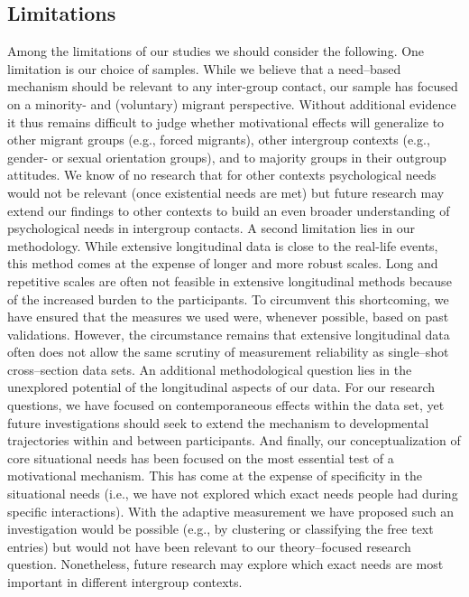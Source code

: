 \documentclass[man, 12pt, a4paper, mask]{apa7}
\theoremstyle{break}
\theoremstyle{plain}
\begin{document}
\subsection{Limitations}
Among the limitations of our studies we should consider the following. One limitation is our choice of samples. While we believe that a need–based mechanism should be relevant to any inter-group contact, our sample has focused on a minority- and (voluntary) migrant perspective. Without additional evidence it thus remains difficult to judge whether motivational effects will generalize to other migrant groups (e.g., forced migrants), other intergroup contexts (e.g., gender- or sexual orientation groups), and to majority groups in their outgroup attitudes. We know of no research that for other contexts psychological needs would not be relevant (once existential needs are met) but future research may extend our findings to other contexts to build an even broader understanding of psychological needs in intergroup contacts. A second limitation lies in our methodology. While extensive longitudinal data is close to the real-life events, this method comes at the expense of longer and more robust scales. Long and repetitive scales are often not feasible in extensive longitudinal methods because of the increased burden to the participants. To circumvent this shortcoming, we have ensured that the measures we used were, whenever possible, based on past validations. However, the circumstance remains that extensive longitudinal data often does not allow the same scrutiny of measurement reliability as single–shot cross–section data sets. An additional methodological question lies in the unexplored potential of the longitudinal aspects of our data. For our research questions, we have focused on contemporaneous effects within the data set, yet future investigations should seek to extend the mechanism to developmental trajectories within and between participants. And finally, our conceptualization of core situational needs has been focused on the most essential test of a motivational mechanism. This has come at the expense of specificity in the situational needs (i.e., we have not explored which exact needs people had during specific interactions). With the adaptive measurement we have proposed such an investigation would be possible (e.g., by clustering or classifying the free text entries) but would not have been relevant to our theory–focused research question. Nonetheless, future research may explore which exact needs are most important in different intergroup contexts. 
\end{document}
